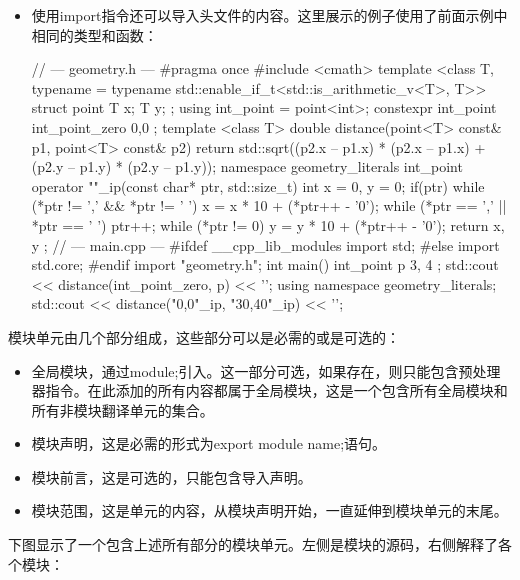\begin{itemize}
\item
使用import指令还可以导入头文件的内容。这里展示的例子使用了前面示例中相同的类型和函数：

\begin{cpp}
// --- geometry.h ---
#pragma once
#include <cmath>
template <class T,
    typename = typename std::enable_if_t<std::is_arithmetic_v<T>, T>>
struct point
{
    T x;
    T y;
};
using int_point = point<int>;
constexpr int_point int_point_zero{ 0,0 };
template <class T>
double distance(point<T> const& p1, point<T> const& p2)
{
    return std::sqrt((p2.x – p1.x) * (p2.x – p1.x) +
                     (p2.y – p1.y) * (p2.y – p1.y));
}
namespace geometry_literals
{
    int_point operator ""_ip(const char* ptr, std::size_t)
    {
        int x = 0, y = 0;
        if(ptr)
        {
            while (*ptr != ',' && *ptr != ' ')
                x = x * 10 + (*ptr++ - '0');
            while (*ptr == ',' || *ptr == ' ') ptr++;
            while (*ptr != 0)
                y = y * 10 + (*ptr++ - '0');
        }
        return { x, y };
    }
}
// --- main.cpp ---
#ifdef __cpp_lib_modules
import std;
#else
import std.core;
#endif
import "geometry.h";
int main()
{
    int_point p{ 3, 4 };
    std::cout << distance(int_point_zero, p) << '\n';
    {
        using namespace geometry_literals;
        std::cout << distance("0,0"_ip, "30,40"_ip) << '\n';
    }
}
\end{cpp}
\end{itemize}


模块单元由几个部分组成，这些部分可以是必需的或是可选的：

\begin{itemize}
\item
全局模块，通过module;引入。这一部分可选，如果存在，则只能包含预处理器指令。在此添加的所有内容都属于全局模块，这是一个包含所有全局模块和所有非模块翻译单元的集合。

\item
模块声明，这是必需的形式为export module name;语句。

\item
模块前言，这是可选的，只能包含导入声明。

\item
模块范围，这是单元的内容，从模块声明开始，一直延伸到模块单元的末尾。
\end{itemize}

下图显示了一个包含上述所有部分的模块单元。左侧是模块的源码，右侧解释了各个模块：

